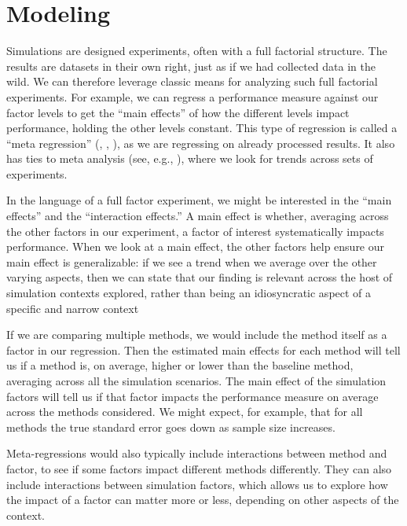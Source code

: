 \documentclass[
]{book}
\begin{document}
\section{Modeling}\label{modeling}

Simulations are designed experiments, often with a full factorial structure.
The results are datasets in their own right, just as if we had collected data in the wild.
We can therefore leverage classic means for analyzing such full factorial experiments.
For example, we can regress a performance measure against our factor levels to get the ``main effects'' of how the different levels impact performance, holding the other levels constant.
This type of regression is called a ``meta regression'' (\citet{kleijnen1981regression}, \citet{friedman1988metamodel}, \citet{gilbert2024multilevel}), as we are regressing on already processed results.
It also has ties to meta analysis (see, e.g., \citet{borenstein2021introduction}), where we look for trends across sets of experiments.

In the language of a full factor experiment, we might be interested in the ``main effects'' and the ``interaction effects.''
A main effect is whether, averaging across the other factors in our experiment, a factor of interest systematically impacts performance.
When we look at a main effect, the other factors help ensure our main effect is generalizable: if we see a trend when we average over the other varying aspects, then we can state that our finding is relevant across the host of simulation contexts explored, rather than being an idiosyncratic aspect of a specific and narrow context

If we are comparing multiple methods, we would include the method itself as a factor in our regression.
Then the estimated main effects for each method will tell us if a method is, on average, higher or lower than the baseline method, averaging across all the simulation scenarios.
The main effect of the simulation factors will tell us if that factor impacts the performance measure on average across the methods considered.
We might expect, for example, that for all methods the true standard error goes down as sample size increases.

Meta-regressions would also typically include interactions between method and factor, to see if some factors impact different methods differently.
They can also include interactions between simulation factors, which allows us to explore how the impact of a factor can matter more or less, depending on other aspects of the context.
\end{document}
